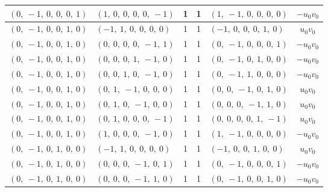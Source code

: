 \documentclass[11pt]{article}
\theoremstyle{definition}
\begin{document}
\begin{longtable}{|l|l|c|c|l|c|}
    \hline
    $\left( 0, \  -1, \  0, \  0, \  0, \  1\right)$ & $\left( 1, \  0, \  0, \  0, \  0, \  -1\right)$ & 1 & 1 & $\left( 1, \  -1, \  0, \  0, \  0, \  0\right)$ & $- u_{0} v_{0}$ \\
    \hline
    $\left( 0, \  -1, \  0, \  0, \  1, \  0\right)$ & $\left( -1, \  1, \  0, \  0, \  0, \  0\right)$ & 1 & 1 & $\left( -1, \  0, \  0, \  0, \  1, \  0\right)$ & $u_{0} v_{0}$ \\
    \hline
    $\left( 0, \  -1, \  0, \  0, \  1, \  0\right)$ & $\left( 0, \  0, \  0, \  0, \  -1, \  1\right)$ & 1 & 1 & $\left( 0, \  -1, \  0, \  0, \  0, \  1\right)$ & $- u_{0} v_{0}$ \\
    \hline
    $\left( 0, \  -1, \  0, \  0, \  1, \  0\right)$ & $\left( 0, \  0, \  0, \  1, \  -1, \  0\right)$ & 1 & 1 & $\left( 0, \  -1, \  0, \  1, \  0, \  0\right)$ & $- u_{0} v_{0}$ \\
    \hline
    $\left( 0, \  -1, \  0, \  0, \  1, \  0\right)$ & $\left( 0, \  0, \  1, \  0, \  -1, \  0\right)$ & 1 & 1 & $\left( 0, \  -1, \  1, \  0, \  0, \  0\right)$ & $- u_{0} v_{0}$ \\
    \hline
    $\left( 0, \  -1, \  0, \  0, \  1, \  0\right)$ & $\left( 0, \  1, \  -1, \  0, \  0, \  0\right)$ & 1 & 1 & $\left( 0, \  0, \  -1, \  0, \  1, \  0\right)$ & $u_{0} v_{0}$ \\
    \hline
    $\left( 0, \  -1, \  0, \  0, \  1, \  0\right)$ & $\left( 0, \  1, \  0, \  -1, \  0, \  0\right)$ & 1 & 1 & $\left( 0, \  0, \  0, \  -1, \  1, \  0\right)$ & $u_{0} v_{0}$ \\
    \hline
    $\left( 0, \  -1, \  0, \  0, \  1, \  0\right)$ & $\left( 0, \  1, \  0, \  0, \  0, \  -1\right)$ & 1 & 1 & $\left( 0, \  0, \  0, \  0, \  1, \  -1\right)$ & $u_{0} v_{0}$ \\
    \hline
    $\left( 0, \  -1, \  0, \  0, \  1, \  0\right)$ & $\left( 1, \  0, \  0, \  0, \  -1, \  0\right)$ & 1 & 1 & $\left( 1, \  -1, \  0, \  0, \  0, \  0\right)$ & $- u_{0} v_{0}$ \\
    \hline
    $\left( 0, \  -1, \  0, \  1, \  0, \  0\right)$ & $\left( -1, \  1, \  0, \  0, \  0, \  0\right)$ & 1 & 1 & $\left( -1, \  0, \  0, \  1, \  0, \  0\right)$ & $u_{0} v_{0}$ \\
    \hline
    $\left( 0, \  -1, \  0, \  1, \  0, \  0\right)$ & $\left( 0, \  0, \  0, \  -1, \  0, \  1\right)$ & 1 & 1 & $\left( 0, \  -1, \  0, \  0, \  0, \  1\right)$ & $- u_{0} v_{0}$ \\
    \hline
    $\left( 0, \  -1, \  0, \  1, \  0, \  0\right)$ & $\left( 0, \  0, \  0, \  -1, \  1, \  0\right)$ & 1 & 1 & $\left( 0, \  -1, \  0, \  0, \  1, \  0\right)$ & $- u_{0} v_{0}$ \\

\end{longtable}
\end{document}
